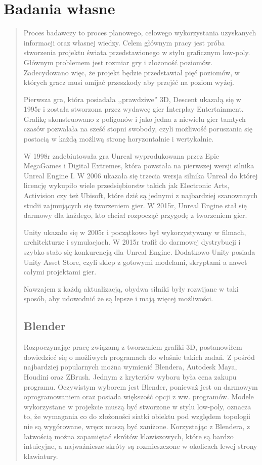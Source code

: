 \chapter{Badania własne}
\begin{quotation}
\indent Proces badawczy to proces planowego, celowego wykorzystania uzyskanych informacji oraz własnej wiedzy. Celem głównym pracy jest próba stworzenia projektu świata przedstawionego w stylu graficznym low-poly. Głównym problemem jest rozmiar gry i złożoność poziomów. Zadecydowano więc, że projekt będzie przedstawiał pięć poziomów, w których gracz musi omijać przeszkody aby przejść na poziom wyżej.

\indent Pierwsza gra, która posiadała ,,prawdziwe'' 3D, Descent ukazałą się w 1995r i została stworzona przez wydawcę gier Interplay Entertainment. Grafikę skonstruowano z poligonów i jako jedna z niewielu gier tamtych czasów pozwalała na sześć stopni swobody, czyli możliwość poruszania się postacią w każdą możliwą stronę horyzontalnie i wertykalnie.

\indent W 1998r zadebiutowała gra Unreal wyprodukowana przez Epic MegaGames i Digital Extremes, która powstała na pierwszej wersji silnika Unreal Engine I. W 2006 ukazała się trzecia wersja silnika Unreal do której licencję wykupiło wiele przedsiębiorstw takich jak Electronic Arts, Activision czy też Ubisoft, które dziś są jednymi z najbardziej szanowanych studii zajmujących się tworzeniem gier. W 2015r, Unreal Engine stał się darmowy dla każdego, kto chciał rozpocząć przygodę z tworzeniem gier.

\indent Unity ukazało się w 2005r i początkowo był wykorzystywany w filmach, architekturze i symulacjach. W 2015r trafił do darmowej dystrybucji i szybko stało się konkurencją dla Unreal Engine. Dodatkowo Unity posiada Unity Asset Store, czyli sklep z gotowymi modelami, skryptami a nawet całymi projektami gier.

\indent Nawzajem z każdą aktualizacją, obydwa silniki były rozwijane w taki sposób, aby udowodnić że są lepsze i mają więcej możliwości.
\section{Blender}

\indent Rozpoczynając pracę związaną z tworzeniem grafiki 3D, postanowiłem dowiedzieć się o możliwych programach do właśnie takich zadań. Z pośród najbardziej popularnych można wymienić Blendera, Autodesk Maya, Houdini oraz ZBrush. Jednym z kryteriów wyboru była cena zakupu programu. Oczywistym wyborem jest Blender, ponieważ jest on darmowym oprogramowaniem oraz posiada większość opcji z ww. programów. Modele wykorzystane w projekcie muszą być stworzone w stylu low-poly, oznacza to, że wymagania co do złożoności siatki obiektu pod względem topologii nie są wygórowane, wręcz muszą być zaniżone. Korzystając z Blendera, z łatwością można zapamiętać skrótów klawiszowych, które są bardzo intuicyjne, a najważniesze skróty są rozmieszczone w okolicach lewej strony klawiatury. 

\end{quotation}
